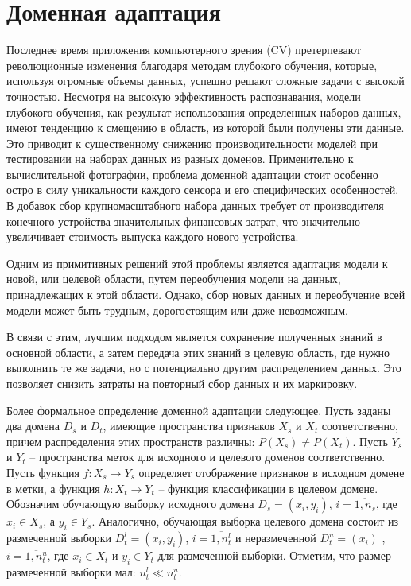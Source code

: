 \section{Доменная адаптация}\label{sect-3}

Последнее время приложения компьютерного зрения (CV) претерпевают революционные изменения благодаря методам глубокого обучения, которые, используя огромные объемы данных, успешно решают сложные задачи с высокой точностью. Несмотря на высокую эффективность распознавания, модели глубокого обучения, как результат использования определенных наборов данных, имеют тенденцию к смещению в область, из которой были получены эти данные. Это приводит к существенному снижению производительности моделей при тестировании на наборах данных из разных доменов. Применительно к вычислительной фотографии, проблема доменной адаптации стоит особенно остро в силу уникальности каждого сенсора и его специфических особенностей. В добавок сбор крупномасштабного набора данных требует от производителя конечного устройства значительных финансовых затрат, что значительно увеличивает стоимость выпуска каждого нового устройства.

Одним из примитивных решений этой проблемы является адаптация модели к новой, или целевой области, путем переобучения модели на данных, принадлежащих к этой области. Однако, сбор новых данных и переобучение всей модели может быть трудным, дорогостоящим или даже невозможным. 

В связи с этим, лучшим подходом является сохранение полученных знаний в основной области, а затем передача этих знаний в целевую область, где нужно выполнить те же задачи, но с потенциально другим распределением данных. Это позволяет снизить затраты на повторный сбор данных и их маркировку.


Более формальное определение доменной адаптации следующее. Пусть заданы два домена $D_s$ и $D_t$, имеющие пространства признаков $X_s$ и $X_t$ соответственно, причем распределения этих пространств различны: $P(X_s) \neq P(X_t)$. Пусть $Y_s$ и $Y_t$ -- пространства меток для исходного и целевого доменов соответственно. Пусть функция $f: X_s \rightarrow Y_s$ определяет отображение признаков в исходном домене в метки, а функция $h: X_t \rightarrow Y_t$ -- функция классификации в целевом домене. Обозначим обучающую выборку исходного домена $D_s = (x_i, y_i)$, $i=\overline{1, n_s}$, где $x_i \in X_s$, а $y_i \in Y_s$. Аналогично, обучающая выборка целевого домена состоит из размеченной выборки $D_t^l =(x_i, y_i)$, $i=\overline{1, n_t^l}$ и неразмеченной $D_t^u = (x_i)$ , $i=\overline{1, n_t^u}$, где $x_i \in X_t$ и $y_i \in Y_t$ для размеченной выборки. Отметим, что размер размеченной выборки мал: $n_t^l \ll n_t^u$. 

